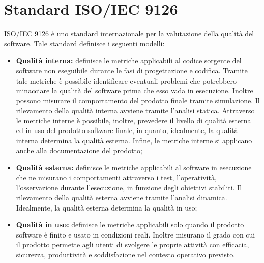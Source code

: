 \chapter{Standard ISO/IEC 9126}\label{StandardISO/IEC9126}
ISO/IEC 9126 è uno standard internazionale per la valutazione della qualità del software.
Tale standard definisce i seguenti modelli:
\begin{itemize}
	\item \textbf{Qualità interna:} definisce le metriche applicabili al codice sorgente del software non eseguibile durante le fasi di progettazione e codifica. Tramite tale metriche è possibile identificare eventuali problemi che potrebbero minacciare la qualità del software prima che esso vada in esecuzione. Inoltre possono misurare il comportamento del prodotto finale tramite simulazione. Il rilevamento della qualità interna avviene tramite l’analisi statica. Attraverso le metriche interne è possibile, inoltre, prevedere il livello di qualità esterna ed in uso del prodotto software finale, in quanto, idealmente, la qualità interna determina la qualità esterna. Infine, le metriche interne si applicano anche alla documentazione del prodotto;
	\item \textbf{Qualità esterna:} definisce le metriche applicabili al software in esecuzione che ne misurano i comportamenti attraverso i test, l’operatività, l’osservazione durante l’esecuzione, in funzione degli obiettivi stabiliti. Il rilevamento della qualità esterna avviene tramite l’analisi dinamica. Idealmente, la qualità esterna determina la qualità in uso;
	\item \textbf{Qualità in uso:} definisce le metriche applicabili solo quando il prodotto software è finito e usato in condizioni reali. Inoltre misurano il grado con cui il prodotto permette agli utenti di svolgere le proprie attività con efficacia, sicurezza, produttività e soddisfazione nel contesto operativo previsto. 
\end{itemize}
